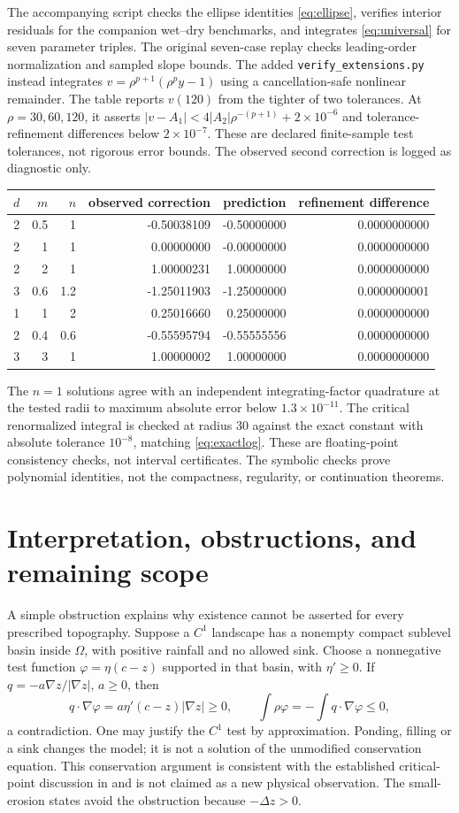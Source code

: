 \documentclass[11pt,a4paper]{article}
\theoremstyle{definition}\newtheorem{definition}[theorem]{Definition}
\theoremstyle{remark}\newtheorem{remark}[theorem]{Remark}
\begin{document}
The accompanying script checks the ellipse identities \eqref{eq:ellipse}, verifies interior residuals for the companion wet--dry benchmarks, and integrates \eqref{eq:universal} for seven parameter triples. The original seven-case replay checks leading-order normalization and sampled slope bounds.
The added \texttt{verify\_extensions.py} instead integrates
$v=\rho^{p+1}(\rho^py-1)$ using a cancellation-safe nonlinear remainder.
The table reports $v(120)$ from the tighter of two tolerances.
At $\rho=30,60,120$, it asserts $|v-A_1|<4|A_2|\rho^{-(p+1)}+2\times10^{-6}$
and tolerance-refinement differences below $2\times10^{-7}$.
These are declared finite-sample test tolerances, not rigorous error bounds.
The observed second correction is logged as diagnostic only.
\begin{center}
\begin{tabular}{rrrrrr}
\toprule
$d$&$m$&$n$&observed correction&prediction&refinement difference\\
\midrule
2&0.5&1&-0.50038109&-0.50000000&0.0000000000\\
2&1&1&0.00000000&-0.00000000&0.0000000000\\
2&2&1&1.00000231&1.00000000&0.0000000000\\
3&0.6&1.2&-1.25011903&-1.25000000&0.0000000001\\
1&1&2&0.25016660&0.25000000&0.0000000000\\
2&0.4&0.6&-0.55595794&-0.55555556&0.0000000000\\
3&3&1&1.00000002&1.00000000&0.0000000000\\
\bottomrule
\end{tabular}
\end{center}
The $n=1$ solutions agree with an independent integrating-factor quadrature at the tested radii to maximum absolute error below $1.3\times10^{-11}$. The critical renormalized integral is checked at radius 30 against the exact constant with absolute tolerance $10^{-8}$, matching \eqref{eq:exactlog}. These are floating-point consistency checks, not interval certificates. The symbolic checks prove polynomial identities, not the compactness, regularity, or continuation theorems.

\section{Interpretation, obstructions, and remaining scope}
A simple obstruction explains why existence cannot be asserted for every prescribed topography. Suppose a $C^1$ landscape has a nonempty compact sublevel basin inside $\Omega$, with positive rainfall and no allowed sink. Choose a nonnegative test function $\varphi=\eta(c-z)$ supported in that basin, with $\eta'\geq0$. If $q=-a\nabla z/|\nabla z|$, $a\geq0$, then
\[
 q\cdot\nabla\varphi=a\eta'(c-z)|\nabla z|\geq0,
 \qquad\int\rho\varphi=-\int q\cdot\nabla\varphi\leq0,
\]
a contradiction. One may justify the $C^1$ test by approximation. Ponding, filling or a sink changes the model; it is not a solution of the unmodified conservation equation. This conservation argument is consistent with the established critical-point discussion in \cite{Bonetti2018} and is not claimed as a new physical observation. The small-erosion states avoid the obstruction because $-\Delta z>0$.
\end{document}
